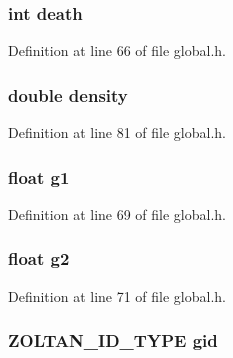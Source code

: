\hypertarget{structcellData_add1e1533be6e693ffedcdbafdf8b855c}{
\subsubsection[{death}]{\setlength{\rightskip}{0pt plus 5cm}int death}}\label{structcellData_add1e1533be6e693ffedcdbafdf8b855c}


Definition at line 66 of file global.\-h.

\hypertarget{structcellData_a6f8c052f8417728038991f7f2826d38d}{
\subsubsection[{density}]{\setlength{\rightskip}{0pt plus 5cm}double density}}\label{structcellData_a6f8c052f8417728038991f7f2826d38d}


Definition at line 81 of file global.\-h.

\hypertarget{structcellData_a581debe7d16bce9d187b97855f4e99d4}{
\subsubsection[{g1}]{\setlength{\rightskip}{0pt plus 5cm}float g1}}\label{structcellData_a581debe7d16bce9d187b97855f4e99d4}


Definition at line 69 of file global.\-h.

\hypertarget{structcellData_aee9971139118d56815564304450c4775}{
\subsubsection[{g2}]{\setlength{\rightskip}{0pt plus 5cm}float g2}}\label{structcellData_aee9971139118d56815564304450c4775}


Definition at line 71 of file global.\-h.

\hypertarget{structcellData_abb4d4bd9231e9f994e87f32cc4fcfce8}{
\subsubsection[{gid}]{\setlength{\rightskip}{0pt plus 5cm}Z\-O\-L\-T\-A\-N\-\_\-\-I\-D\-\_\-\-T\-Y\-P\-E gid}}\label{structcellData_abb4d4bd9231e9f994e87f32cc4fcfce8}


